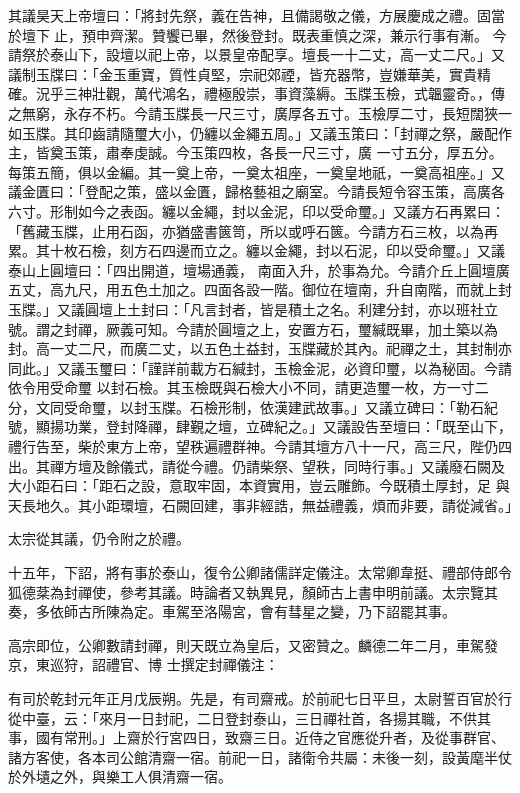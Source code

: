 \begin{pinyinscope}
 其議昊天上帝壇曰：「將封先祭，義在告神，且備謁敬之儀，方展慶成之禮。固當於壇下止，預申齊潔。贊饗已畢，然後登封。既表重慎之深，兼示行事有漸。
 今請祭於泰山下，設壇以祀上帝，以景皇帝配享。壇長一十二丈，高一丈二尺。」又議制玉牒曰：「金玉重寶，質性貞堅，宗祀郊禋，皆充器幣，豈嫌華美，實貴精確。況乎三神壯觀，萬代鴻名，禮極殷崇，事資藻縟。玉牒玉檢，式韞靈奇。，傳之無窮，永存不朽。今請玉牒長一尺三寸，廣厚各五寸。玉檢厚二寸，長短闊狹一如玉牒。其印齒請隨璽大小，仍纏以金繩五周。」又議玉策曰：「封禪之祭，嚴配作主，皆奠玉策，肅奉虔誠。今玉策四枚，各長一尺三寸，廣
 一寸五分，厚五分。每策五簡，俱以金編。其一奠上帝，一奠太祖座，一奠皇地祇，一奠高祖座。」又議金匱曰：「登配之策，盛以金匱，歸格藝祖之廟室。今請長短令容玉策，高廣各六寸。形制如今之表函。纏以金繩，封以金泥，印以受命璽。」又議方石再累曰：「舊藏玉牒，止用石函，亦猶盛書篋笥，所以或呼石篋。今請方石三枚，以為再累。其十枚石檢，刻方石四邊而立之。纏以金繩，封以石泥，印以受命璽。」又議泰山上圓壇曰：「四出開道，壇場通義，
 南面入升，於事為允。今請介丘上圓壇廣五丈，高九尺，用五色土加之。四面各設一階。御位在壇南，升自南階，而就上封玉牒。」又議圓壇上土封曰：「凡言封者，皆是積土之名。利建分封，亦以班社立號。謂之封禪，厥義可知。今請於圓壇之上，安置方石，璽緘既畢，加土築以為封。高一丈二尺，而廣二丈，以五色土益封，玉牒藏於其內。祀禪之土，其封制亦同此。」又議玉璽曰：「謹詳前載方石緘封，玉檢金泥，必資印璽，以為秘固。今請依令用受命璽
 以封石檢。其玉檢既與石檢大小不同，請更造璽一枚，方一寸二分，文同受命璽，以封玉牒。石檢形制，依漢建武故事。」又議立碑曰：「勒石紀號，顯揚功業，登封降禪，肆覲之壇，立碑紀之。」又議設告至壇曰：「既至山下，禮行告至，柴於東方上帝，望秩遍禮群神。今請其壇方八十一尺，高三尺，陛仍四出。其禪方壇及餘儀式，請從今禮。仍請柴祭、望秩，同時行事。」又議廢石闕及大小距石曰：「距石之設，意取牢固，本資實用，豈云雕飾。今既積土厚封，足
 與天長地久。其小距環壇，石闕回建，事非經誥，無益禮義，煩而非要，請從減省。」



 太宗從其議，仍令附之於禮。



 十五年，下詔，將有事於泰山，復令公卿諸儒詳定儀注。太常卿韋挺、禮部侍郎令狐德棻為封禪使，參考其議。時論者又執異見，顏師古上書申明前議。太宗覽其奏，多依師古所陳為定。車駕至洛陽宮，會有彗星之變，乃下詔罷其事。



 高宗即位，公卿數請封禪，則天既立為皇后，又密贊之。麟德二年二月，車駕發京，東巡狩，詔禮官、博
 士撰定封禪儀注：



 有司於乾封元年正月戊辰朔。先是，有司齋戒。於前祀七日平旦，太尉誓百官於行從中臺，云：「來月一日封祀，二日登封泰山，三日禪社首，各揚其職，不供其事，國有常刑。」上齋於行宮四日，致齋三日。近侍之官應從升者，及從事群官、諸方客使，各本司公館清齋一宿。前祀一日，諸衛令共屬：未後一刻，設黃麾半仗於外壝之外，與樂工人俱清齋一宿。




\end{pinyinscope}
